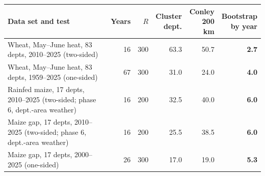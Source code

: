 \begin{tabular}{>{\raggedright}p{5.6cm}rrrrr}
\toprule
Data set and test & Years & $R$ & \shortstack{Cluster\\dept.} & \shortstack{Conley\\200 km} & \shortstack{Bootstrap\\by year} \\
\midrule
Wheat, May--June heat, 83 depts, 2010--2025 (two-sided) & 16 & 300 & 63.3 & 50.7 & \textbf{2.7} \\
Wheat, May--June heat, 83 depts, 1959--2025 (one-sided) & 67 & 300 & 31.0 & 24.0 & \textbf{4.0} \\
Rainfed maize, 17 depts, 2010--2025 (two-sided; phase 6, dept.-area weather) & 16 & 200 & 32.5 & 40.0 & \textbf{6.0} \\
Maize gap, 17 depts, 2010--2025 (two-sided; phase 6, dept.-area weather) & 16 & 200 & 25.5 & 38.5 & \textbf{6.0} \\
Maize gap, 17 depts, 2000--2025 (one-sided) & 26 & 300 & 17.0 & 19.0 & \textbf{5.3} \\
\bottomrule
\end{tabular}
